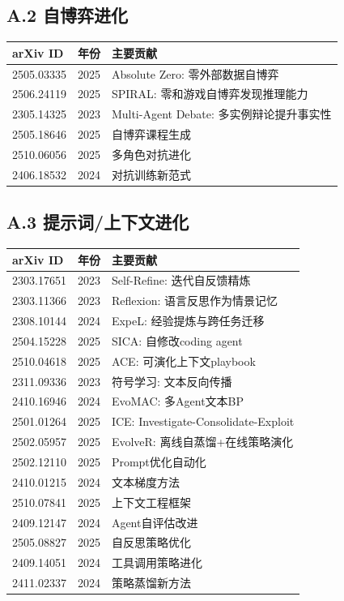 \subsection*{A.2 自博弈进化}

\begin{longtable}{llp{7cm}}
\toprule
\textbf{arXiv ID} & \textbf{年份} & \textbf{主要贡献} \\
\midrule
2505.03335 & 2025 & Absolute Zero: 零外部数据自博弈 \\
2506.24119 & 2025 & SPIRAL: 零和游戏自博弈发现推理能力 \\
2305.14325 & 2023 & Multi-Agent Debate: 多实例辩论提升事实性 \\
2505.18646 & 2025 & 自博弈课程生成 \\
2510.06056 & 2025 & 多角色对抗进化 \\
2406.18532 & 2024 & 对抗训练新范式 \\
\bottomrule
\end{longtable}

\subsection*{A.3 提示词/上下文进化}

\begin{longtable}{llp{7cm}}
\toprule
\textbf{arXiv ID} & \textbf{年份} & \textbf{主要贡献} \\
\midrule
2303.17651 & 2023 & Self-Refine: 迭代自反馈精炼 \\
2303.11366 & 2023 & Reflexion: 语言反思作为情景记忆 \\
2308.10144 & 2024 & ExpeL: 经验提炼与跨任务迁移 \\
2504.15228 & 2025 & SICA: 自修改coding agent \\
2510.04618 & 2025 & ACE: 可演化上下文playbook \\
2311.09336 & 2023 & 符号学习: 文本反向传播 \\
2410.16946 & 2024 & EvoMAC: 多Agent文本BP \\
2501.01264 & 2025 & ICE: Investigate-Consolidate-Exploit \\
2502.05957 & 2025 & EvolveR: 离线自蒸馏+在线策略演化 \\
2502.12110 & 2025 & Prompt优化自动化 \\
2410.01215 & 2024 & 文本梯度方法 \\
2510.07841 & 2025 & 上下文工程框架 \\
2409.12147 & 2024 & Agent自评估改进 \\
2505.08827 & 2025 & 自反思策略优化 \\
2409.14051 & 2024 & 工具调用策略进化 \\
2411.02337 & 2024 & 策略蒸馏新方法 \\
\bottomrule
\end{longtable}


